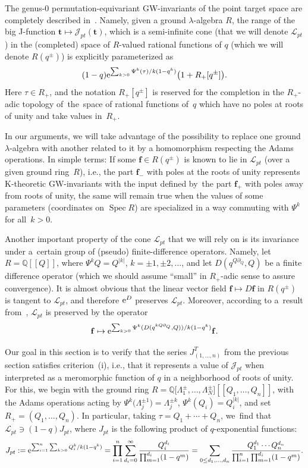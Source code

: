 \documentclass[10pt,a4paper]{amsart}
\numberwithin{equation}{section}
\def\J{\mathcal J}
\def\L{\mathcal L}
\def\QQ{\mathbb Q}
\def\p{\partial}
\def\f{{\mathbf f}}
\def\t{{\mathbf t}}
\theoremstyle{definition}
\theoremstyle{plain}
\begin{document}
The genus-$0$ permutation-equivariant GW-invariants of the point target space are completely described in~\cite{Givental:perm3}. Namely, given a ground $\lambda$-algebra $R$, the range of the big J-function
$\t\mapsto \J_{pt}(\t)$, which is a semi-infinite cone (that we will denote $\L_{pt}$) in the (completed) space of $R$-valued rational functions of $q$ (which we will denote $R(q^{\pm})$) is explicitly parameterized as
\[
(1-q) {\rm e}^{ \sum_{k>0}\Psi^k(\tau)/k(1-q^k)}\big(1+R_{+}[q^{\pm}]\big).
\]
Here $\tau\in R_{+}$, and the notation $R_{+}[q^{\pm}]$ is reserved for the completion in the $R_{+}$-adic topology of~the~space of rational functions of~$q$ which have no poles at roots of unity and take values in~$R_{+}$.

In our arguments, we will take advantage of the possibility to replace one ground $\lambda$-algebra with another related to it by a homomorphism respecting the Adams operations. In simple terms: If some
$\f\in R(q^{\pm})$ is known to lie in $\L_{pt}$ (over a given ground ring~$R$), i.e., the part $\f_{-}$ with poles at the roots of unity represents K-theoretic GW-invariants with the input defined by~the part $\f_{+}$ with poles away from roots of unity, the same will remain true when the values of some parameters (coordinates on $\operatorname{Spec} R$) are specialized in a way commuting with $\Psi^k$ for all~$k>0$.

Another important property of the cone $\L_{pt}$ that we will rely on is its invariance under a~cer\-tain group of (pseudo) finite-difference operators. Namely, let $R=\QQ[[Q]]$, where $\Psi^kQ=Q^{|k|}$, $k=\pm 1,\pm 2,\dots$, and let $D(q^{Q\p_Q},Q)$ be a finite difference operator (which we should assume ``small'' in $R_{+}$-adic sense to assure convergence). It is almost obvious that the linear vector field $\f \mapsto D\f$ in $R(q^{\pm})$ is tangent to $\L_{pt}$, and therefore ${\rm e}^D$ preserves $\L_{pt}$. Moreover, according to a~result from~\cite{Givental:perm4}, $\L_{pt}$ is preserved by the operator
\[
\f\mapsto {\rm e}^{ \sum_{k>0} \Psi^k(D(q^{kQ\p_Q},Q))/k(1-q^k)} \f.
\]

Our goal in this section is to verify that the series $J^T_{(1,\dots,n)}$ from the previous section satis\-fies criterion~(i), i.e., that it represents a value of $\J_{pt}$ when interpreted as a meromorphic function of $q$ in a neighborhood of roots of unity. For this, we begin with the ground ring $R=\QQ\big[\Lambda_1^{\pm},\dots,\Lambda_N^{\pm}\big][[Q_1,\dots,Q_n]]$, with the Adams operations acting by $\Psi^k\big(\Lambda_j^{\pm 1}\big)=\Lambda_j^{\pm k}$, $\Psi^k(Q_i)=Q_i^{|k|}$, and set $R_{+}=(Q_1,\dots,Q_n)$. In particular, taking $\tau=Q_1+\cdots+Q_n$, we~find that $\L_{pt}\ni (1-q) J_{pt}$, where $J_{pt}$ is the following product of $q$-exponential functions:
\begin{gather*}
J_{pt}:= {\rm e}^{\sum_{i=1}^n\sum_{k>0}Q_i^k/k(1-q^k)}
= \prod_{i=1}^n \sum_{d_i=0}^{\infty}\frac{Q_i^{d_i}}{\prod_{m=1}^{d_i}(1-q^m)}
 = \sum_{0\leq d_1,\dots,d_n}\frac{Q_1^{d_1}\cdots Q_n^{d_n}}{\prod_{i=1}^n\prod_{m=1}^{d_i}(1-q^m)}.
 \end{gather*}
\end{document}
